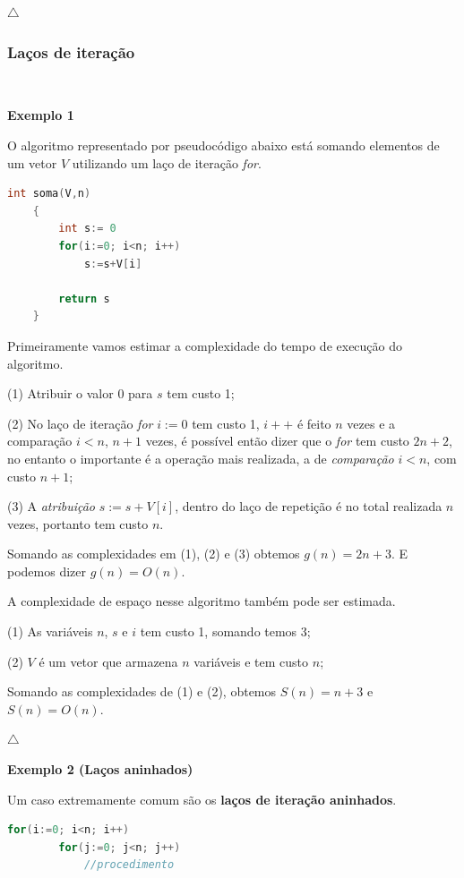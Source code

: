 {\raggedleft $\bigtriangleup$ \par}

\subsubsection{Laços de iteração}
\

\textbf{Exemplo 1}

O algoritmo representado por pseudocódigo abaixo está somando elementos de um vetor $V$ utilizando um laço de iteração \textit{for}.
\begin{lstlisting}[language=C, frame=single]
    int soma(V,n) 
    {
        int s:= 0
        for(i:=0; i<n; i++)
            s:=s+V[i]

        return s
    }
\end{lstlisting}

Primeiramente vamos estimar a complexidade do tempo de execução do algoritmo. 

(1) Atribuir o valor 0 para $s$ tem custo 1; 

(2) No laço de iteração \textit{for} $i:=0$ tem custo 1, $i++$ é feito $n$ vezes e a comparação $i<n$, $n+1$ vezes, é possível então dizer que o \textit{for} tem custo $2n+2$, no entanto  o importante é a operação mais realizada, a de \textit{comparação} $i<n$, com custo $n+1$;

(3) A \textit{atribuição} $s:=s+V[i]$, dentro do laço de repetição é no total realizada $n$ vezes, portanto tem custo $n$.

Somando as complexidades em (1), (2) e (3) obtemos $g(n)=2n+3$. E podemos dizer $g(n)=O(n)$.

A complexidade de espaço nesse algoritmo também pode ser estimada.

(1) As variáveis $n$, $s$ e $i$ tem custo 1, somando temos 3;

(2) $V$ é um vetor que armazena $n$ variáveis e tem custo $n$;

Somando as complexidades de (1) e (2), obtemos $S(n)=n+3$ e $S(n)=O(n)$.

{\raggedleft $\bigtriangleup$ \par}

\textbf{Exemplo 2 (Laços aninhados)}

Um caso extremamente comum são os \textbf{laços de iteração aninhados}.
\begin{lstlisting}[language=C, frame=single]
    for(i:=0; i<n; i++)
        for(j:=0; j<n; j++)
            //procedimento
\end{lstlisting}

